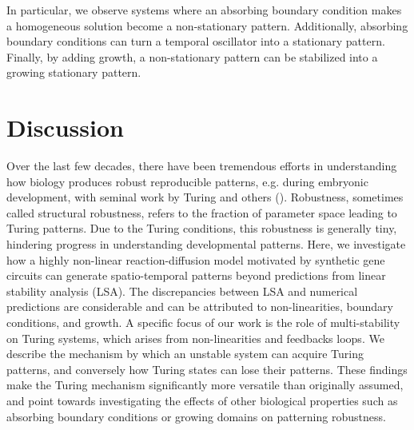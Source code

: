 \documentclass[10pt,letterpaper]{article}
\begin{document}

In particular, we observe systems where an absorbing boundary condition makes a homogeneous solution become a non-stationary pattern.
Additionally, absorbing boundary conditions can turn a temporal oscillator into a stationary pattern.
Finally, by adding growth, a non-stationary pattern can be stabilized into a growing stationary pattern.



\section*{Discussion}

Over the last few decades, there have been tremendous efforts in understanding how biology produces robust reproducible patterns, e.g. during embryonic development, with seminal work by Turing and others (\cite{Turing1952,Gierer1972, maini2012turing}). Robustness, sometimes called structural robustness, refers to the fraction of parameter space leading to Turing patterns. Due to the Turing conditions, this robustness is generally tiny, hindering progress in understanding developmental patterns. Here, we investigate how a highly non-linear reaction-diffusion model motivated by synthetic gene circuits can generate spatio-temporal patterns beyond predictions from linear stability analysis (LSA). The discrepancies between LSA and numerical predictions are considerable and can be attributed to non-linearities, boundary conditions, and growth. A specific focus of our work is the role of multi-stability on Turing systems, which arises from non-linearities and feedbacks loops. We describe the mechanism by which an unstable system can acquire Turing patterns, and conversely how Turing states can lose their patterns. These findings make the Turing mechanism significantly more versatile than originally assumed, and point towards investigating the effects of other biological properties such as absorbing boundary conditions or growing domains on patterning robustness. 
\end{document}
